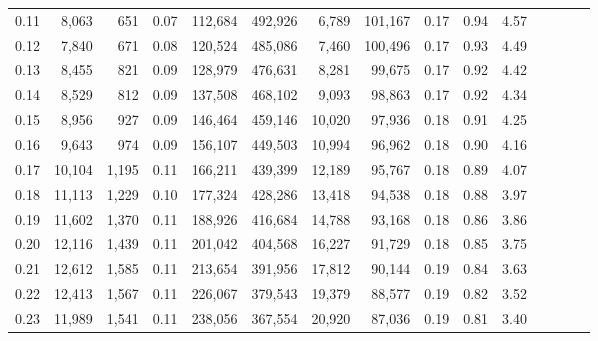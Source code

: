 \begin{tabular}{rrrcrrrrrrrrrrr}
0.11 &   8,063 &    651 &                                       0.07 &  112,684 &  492,926 &    6,789 &  101,167 &  0.17 &  0.94 &                         4.57 \\
0.12 &   7,840 &    671 &                                       0.08 &  120,524 &  485,086 &    7,460 &  100,496 &  0.17 &  0.93 &                         4.49 \\
0.13 &   8,455 &    821 &                                       0.09 &  128,979 &  476,631 &    8,281 &   99,675 &  0.17 &  0.92 &                         4.42 \\
0.14 &   8,529 &    812 &                                       0.09 &  137,508 &  468,102 &    9,093 &   98,863 &  0.17 &  0.92 &                         4.34 \\
0.15 &   8,956 &    927 &                                       0.09 &  146,464 &  459,146 &   10,020 &   97,936 &  0.18 &  0.91 &                         4.25 \\
0.16 &   9,643 &    974 &                                       0.09 &  156,107 &  449,503 &   10,994 &   96,962 &  0.18 &  0.90 &                         4.16 \\
0.17 &  10,104 &  1,195 &                                       0.11 &  166,211 &  439,399 &   12,189 &   95,767 &  0.18 &  0.89 &                         4.07 \\
0.18 &  11,113 &  1,229 &                                       0.10 &  177,324 &  428,286 &   13,418 &   94,538 &  0.18 &  0.88 &                         3.97 \\
0.19 &  11,602 &  1,370 &                                       0.11 &  188,926 &  416,684 &   14,788 &   93,168 &  0.18 &  0.86 &                         3.86 \\
0.20 &  12,116 &  1,439 &                                       0.11 &  201,042 &  404,568 &   16,227 &   91,729 &  0.18 &  0.85 &                         3.75 \\
0.21 &  12,612 &  1,585 &                                       0.11 &  213,654 &  391,956 &   17,812 &   90,144 &  0.19 &  0.84 &                         3.63 \\
0.22 &  12,413 &  1,567 &                                       0.11 &  226,067 &  379,543 &   19,379 &   88,577 &  0.19 &  0.82 &                         3.52 \\
0.23 &  11,989 &  1,541 &                                       0.11 &  238,056 &  367,554 &   20,920 &   87,036 &  0.19 &  0.81 &                         3.40 \\

\end{tabular}
